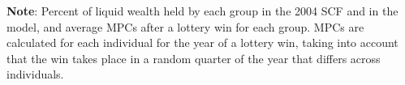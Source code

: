 \documentclass{econsocart}
\begin{document}
\begin{table}[tb] 
  \caption{\pregenmark Model fit with respect to nontargeted moments}
  \label{tab:nonTargetedMoments} %
  \centering


  \vspace{0.5em}

  \noindent\parbox{\textwidth}{\footnotesize
    \textbf{Note}: Percent of liquid wealth held by each group in the 2004 SCF and in the model, and average MPCs after a lottery win for each group. MPCs are calculated for each individual for the year of a lottery win, taking into account that the win takes place in a random quarter of the year that differs across individuals.}

  \vspace{0.5em}

\end{table}
\end{document}
